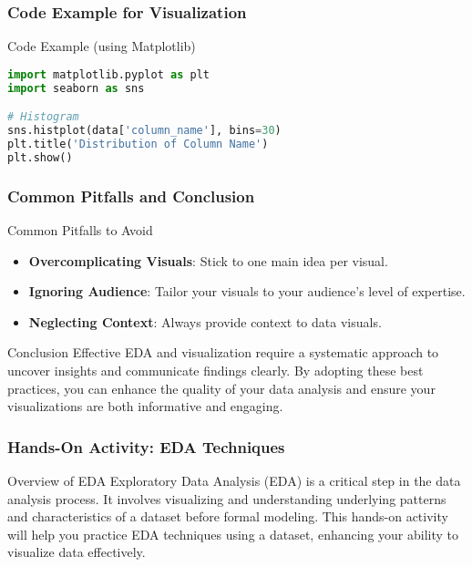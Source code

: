 \documentclass[aspectratio=169]{beamer}
\begin{document}
\begin{frame}[fragile]
    \frametitle{Code Example for Visualization}
    \begin{block}{Code Example (using Matplotlib)}
        \begin{lstlisting}[language=Python]
import matplotlib.pyplot as plt
import seaborn as sns

# Histogram
sns.histplot(data['column_name'], bins=30)
plt.title('Distribution of Column Name')
plt.show()
        \end{lstlisting}
    \end{block}
\end{frame}

\begin{frame}[fragile]
    \frametitle{Common Pitfalls and Conclusion}
    \begin{block}{Common Pitfalls to Avoid}
        \begin{itemize}
            \item \textbf{Overcomplicating Visuals}: Stick to one main idea per visual.
            \item \textbf{Ignoring Audience}: Tailor your visuals to your audience’s level of expertise.
            \item \textbf{Neglecting Context}: Always provide context to data visuals.
        \end{itemize}
    \end{block}

    \begin{block}{Conclusion}
        Effective EDA and visualization require a systematic approach to uncover insights and communicate findings clearly. By adopting these best practices, you can enhance the quality of your data analysis and ensure your visualizations are both informative and engaging.
    \end{block}
\end{frame}

\begin{frame}[fragile]
    \frametitle{Hands-On Activity: EDA Techniques}
    \begin{block}{Overview of EDA}
        Exploratory Data Analysis (EDA) is a critical step in the data analysis process. It involves visualizing and understanding underlying patterns and characteristics of a dataset before formal modeling.
        This hands-on activity will help you practice EDA techniques using a dataset, enhancing your ability to visualize data effectively.
    \end{block}
\end{frame}
\end{document}
